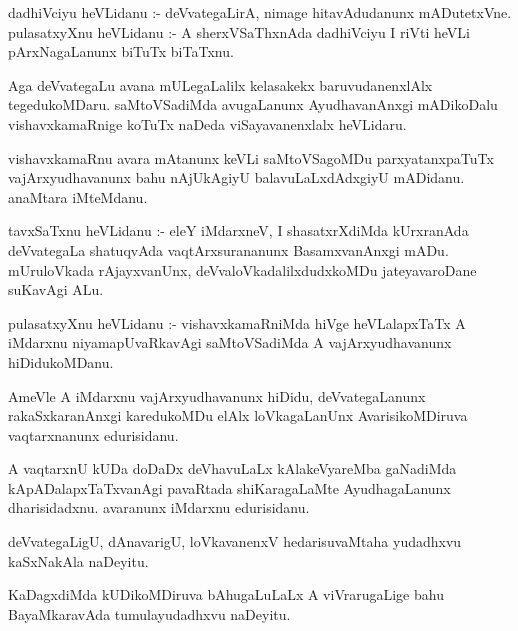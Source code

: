 \documentclass{article}
\begin{document}
\begin{mn}
dadhiVciyu  heVLidanu :- deVvategaLirA,  nimage  hitavAdudanunx  mADutetxVne.  pulasatxyXnu  
heVLidanu :- A sherxVSaThxnAda  dadhiVciyu  I riVti  heVLi  pArxNagaLanunx  biTuTx biTaTxnu.
\end{mn}

\begin{mn}
Aga  deVvategaLu  avana  mULegaLalilx  kelasakekx  baruvudanenxlAlx  tegedukoMDaru.  
saMtoVSadiMda  avugaLanunx  AyudhavanAnxgi  mADikoDalu  vishavxkamaRnige  koTuTx  
naDeda  viSayavanenxlalx  heVLidaru.
\end{mn}

\begin{mn}
vishavxkamaRnu  avara  mAtanunx  keVLi  saMtoVSagoMDu  parxyatanxpaTuTx  vajArxyudhavanunx  
bahu  nAjUkAgiyU  balavuLaLxdAdxgiyU  mADidanu.  anaMtara  iMteMdanu.
\end{mn}

\begin{mn}
tavxSaTxnu  heVLidanu :- eleY  iMdarxneV,  I  shasatxrXdiMda  kUrxranAda deVvategaLa  
shatuqvAda  vaqtArxsurananunx  BasamxvanAnxgi  mADu.  mUruloVkada   rAjayxvanUnx,  
deVvaloVkadalilxdudxkoMDu  jateyavaroDane  suKavAgi  ALu.  
\end{mn}

\begin{mn}
pulasatxyXnu  heVLidanu :- vishavxkamaRniMda  hiVge  heVLalapxTaTx  A iMdarxnu  
niyamapUvaRkavAgi  saMtoVSadiMda  A  vajArxyudhavanunx  hiDidukoMDanu.
\end{mn}

\begin{mn}
AmeVle  A  iMdarxnu  vajArxyudhavanunx  hiDidu,  deVvategaLanunx  rakaSxkaranAnxgi  
karedukoMDu  elAlx  loVkagaLanUnx  AvarisikoMDiruva  vaqtarxnanunx  edurisidanu.
\end{mn}

\begin{mn}
A  vaqtarxnU  kUDa  doDaDx  deVhavuLaLx  kAlakeVyareMba  gaNadiMda  kApADalapxTaTxvanAgi  
pavaRtada  shiKaragaLaMte  AyudhagaLanunx  dharisidadxnu.  avaranunx  iMdarxnu  edurisidanu.
\end{mn}

\begin{mn}
deVvategaLigU,  dAnavarigU,  loVkavanenxV  hedarisuvaMtaha  yudadhxvu  kaSxNakAla  naDeyitu.
\end{mn}

\begin{mn}
KaDagxdiMda  kUDikoMDiruva  bAhugaLuLaLx  A  viVrarugaLige  bahu  BayaMkaravAda  
tumulayudadhxvu  naDeyitu.
\end{mn}
\end{document}
